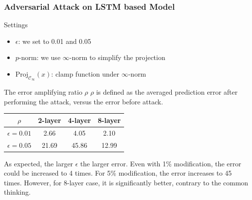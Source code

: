 \documentclass{beamer}
\begin{document}
\begin{frame}
\begin{frame}
\begin{frame}
\begin{frame}
\begin{frame}
\end{frame}

\begin{frame}
\frametitle{Adversarial Attack on LSTM based Model}
\begin{block}{Settings}
\begin{itemize}
\setlength\itemsep{0em}
\item $\epsilon$: we set to 0.01 and 0.05
\item $p$-norm: we use $\infty$-norm to simplify the projection
\item $\text{Proj}_{\mathcal{C}_\infty}(x)$: clamp function under $\infty$-norm
\end{itemize}
\end{block}

\begin{block}{The error amplifying ratio $\rho$}
$\rho$ is defined as the averaged prediction error after performing the attack, versus the error before attack.

\begin{table}[]
\begin{tabular}{c|ccc}
$\rho$          & 2-layer & 4-layer & 8-layer  \\
\hline
$\epsilon=0.01$ & 2.66  & 4.05  & 2.10 \\
$\epsilon=0.05$ & 21.69 & 45.86 & 12.99  \\
\end{tabular}
\end{table}
\vspace{-0.1in}
As expected, the larger $\epsilon$ the larger error. Even with 1\% modification, the error could be increased to 4 times. For 5\% modification, the error increases to 45 times.
However, for 8-layer case, it is significantly better, contrary to the common thinking.
\end{block}
\end{frame}



\end{frame}
\end{frame}
\end{frame}
\end{frame}
\end{document}

